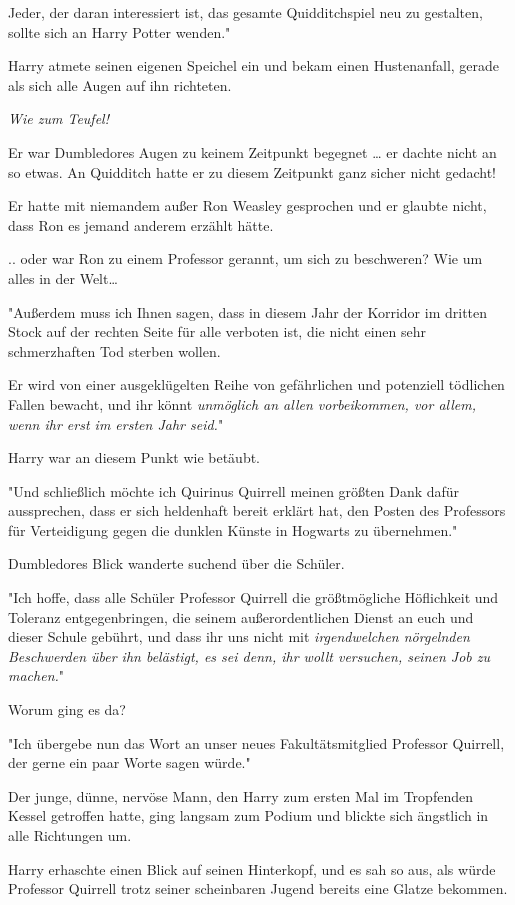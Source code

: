 {Jeder, der daran interessiert ist, das gesamte Quidditchspiel neu zu gestalten, sollte sich an Harry Potter wenden."

Harry atmete seinen eigenen Speichel ein und bekam einen Hustenanfall, gerade als sich alle Augen auf ihn richteten.

\emph{Wie zum Teufel!}

Er war Dumbledores Augen zu keinem Zeitpunkt begegnet … er dachte nicht an so etwas. An Quidditch hatte er zu diesem Zeitpunkt ganz sicher nicht gedacht!

Er hatte mit niemandem außer Ron Weasley gesprochen und er glaubte nicht, dass Ron es jemand anderem erzählt hätte.

.. oder war Ron zu einem Professor gerannt, um sich zu beschweren? Wie um alles in der Welt…

"Außerdem muss ich Ihnen sagen, dass in diesem Jahr der Korridor im dritten Stock auf der rechten Seite für alle verboten ist, die nicht einen sehr schmerzhaften Tod sterben wollen.

Er wird von einer ausgeklügelten Reihe von gefährlichen und potenziell tödlichen Fallen bewacht, und ihr könnt \emph{unmöglich an allen vorbeikommen, vor allem, wenn ihr erst im ersten Jahr seid.}"

Harry war an diesem Punkt wie betäubt.

"Und schließlich möchte ich Quirinus Quirrell meinen größten Dank dafür aussprechen, dass er sich heldenhaft bereit erklärt hat, den Posten des Professors für Verteidigung gegen die dunklen Künste in Hogwarts zu übernehmen."

Dumbledores Blick wanderte suchend über die Schüler.

"Ich hoffe, dass alle Schüler Professor Quirrell die größtmögliche Höflichkeit und Toleranz entgegenbringen, die seinem außerordentlichen Dienst an euch und dieser Schule gebührt, und dass ihr uns nicht mit \emph{irgendwelchen nörgelnden Beschwerden über ihn belästigt, es sei denn, ihr wollt versuchen, seinen Job zu machen.}"

Worum ging es da?

"Ich übergebe nun das Wort an unser neues Fakultätsmitglied Professor Quirrell, der gerne ein paar Worte sagen würde."

Der junge, dünne, nervöse Mann, den Harry zum ersten Mal im Tropfenden Kessel getroffen hatte, ging langsam zum Podium und blickte sich ängstlich in alle Richtungen um.

Harry erhaschte einen Blick auf seinen Hinterkopf, und es sah so aus, als würde Professor Quirrell trotz seiner scheinbaren Jugend bereits eine Glatze bekommen.

}
